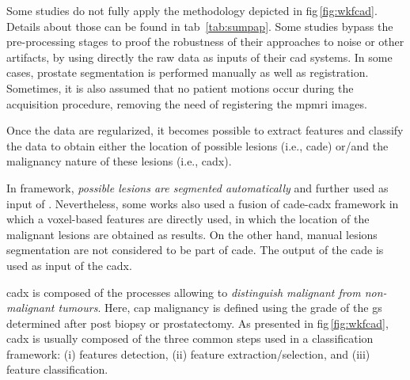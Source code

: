 Some studies do not fully apply the methodology depicted in \acs{fig}\,\ref{fig:wkfcad}.
Details about those can be found in \acs{tab}~\ref{tab:sumpap}.
Some studies bypass the pre-processing stages to proof the robustness of their approaches to noise or other artifacts, by using directly the raw data as inputs of their \ac{cad} systems.
In some cases, prostate segmentation is performed manually as well as registration.
Sometimes, it is also assumed that no patient motions occur during the acquisition procedure, removing the need of registering the \ac{mpmri} images.

Once the data are regularized, it becomes possible to extract features and classify the data to obtain either the location of possible lesions (i.e., \ac{cade}) or/and the malignancy nature of these lesions (i.e., \ac{cadx}).

In  framework, \textit{possible lesions are segmented automatically} and further used as input of .
Nevertheless, some works also used a fusion of \ac{cade}-\ac{cadx} framework in which a voxel-based features are directly used, in which the location of the malignant lesions are obtained as results.
On the other hand, manual lesions segmentation are not considered to be part of \ac{cade}.
The output of the \ac{cade} is used as input of the \ac{cadx}.

\Ac{cadx} is composed of the processes allowing to \textit{distinguish malignant from non-malignant tumours}.
Here, \ac{cap} malignancy is defined using the grade of the \ac{gs} determined after post biopsy or prostatectomy.
As presented in \ac{fig}\,\ref{fig:wkfcad}, \ac{cadx} is usually composed of the three common steps used in a classification framework: (i) features detection, (ii) feature extraction/selection, and (iii) feature classification.



